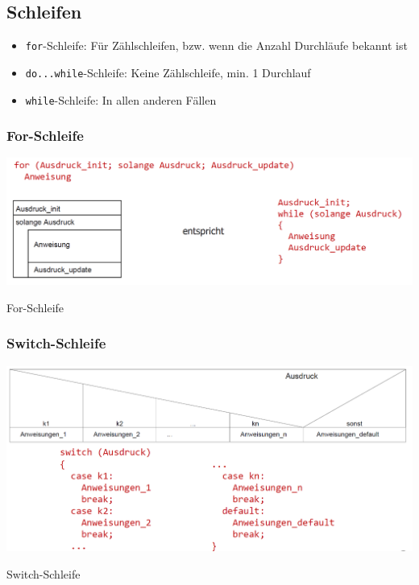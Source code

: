 	\subsection{Schleifen}
		\begin{itemize}
			\item \verb|for|-Schleife: Für Zählschleifen, bzw. wenn die Anzahl Durchläufe bekannt ist
			\item \verb|do...while|-Schleife: Keine Zählschleife, min. 1 Durchlauf
			\item \verb|while|-Schleife: In allen anderen Fällen	
		\end{itemize}

		\subsubsection{For-Schleife}
			\begin{minipage}{.45\linewidth}
				\includegraphics[width=0.95\linewidth]{Bilder/forschleife.png}
			\end{minipage}
			\hfill
			\begin{minipage}{.5\linewidth}
				For-Schleife
			\end{minipage}

		\subsubsection{Switch-Schleife}
			\begin{minipage}{.45\linewidth}
				\includegraphics[width=0.95\linewidth]{Bilder/Switch.png}
			\end{minipage}
			\hfill
			\begin{minipage}{.5\linewidth}
				Switch-Schleife
			\end{minipage}

